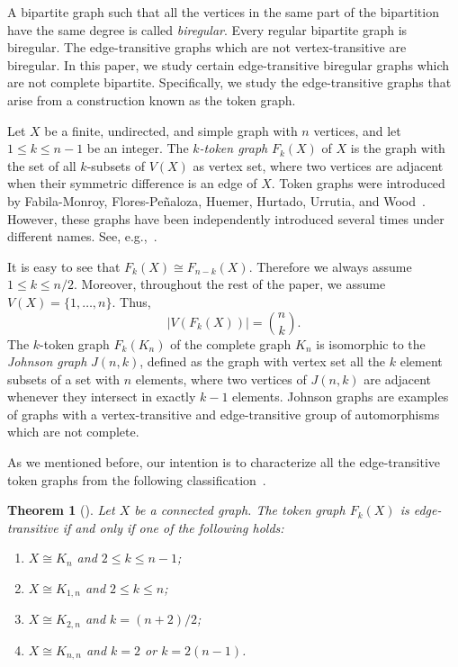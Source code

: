 \documentclass[letterpaper,10pt]{article}
\theoremstyle{plain}
\newtheorem{theorem}{Theorem}[section]
\theoremstyle{definition}
\newcommand{\G}{X}
\begin{document}
A bipartite graph such that all the vertices in the same part of the bipartition have the same degree is called \emph{biregular}. 
Every regular bipartite graph is biregular. 
The edge-transitive graphs which are not vertex-transitive are biregular. 
In this paper, we study certain edge-transitive biregular graphs which are not complete bipartite.  
Specifically,  we study the edge-transitive  graphs that arise from a construction known as the token graph. 



Let $\G$ be a finite, undirected, and simple graph with $n$ vertices, and let $1 \le k \le n-1 $ be an integer. 
The \emph{$k$-token graph} $F_k(\G)$ of $\G$ is the graph 
with the set of all $k$-subsets of $V(X)$ as vertex set, where two vertices are adjacent when their symmetric difference is an edge of $\G$. 
Token graphs were introduced by Fabila-Monroy, Flores-Peñaloza, Huemer, Hurtado, Urrutia, and Wood~\cite{FFHH}. 
However, these graphs have been independently introduced several times under different names. See, e.g.,~\cite{John,ABE,AGR}.

It is easy to see that $F_{k}(\G) \cong F_{n-k}(\G)$. 
Therefore we always assume $1 \leq k \leq n/2$. 
Moreover, throughout the rest of the paper, we assume 
$V(X)  = \{1, \dots, n\}$. 
Thus, 
\[
|V(F_{k}(\G))| =\binom{n}{k}. 
\]
The $k$-token graph $F_k(K_n)$ of the complete graph $K_n$ is isomorphic to the \emph{Johnson graph} $J(n,k)$, defined as the graph with vertex set all the $k$ element subsets of a set with $n$ elements, where two vertices of $J(n,k)$ are adjacent whenever they intersect in exactly $k-1$ elements. 
Johnson graphs are examples of graphs with  a vertex-transitive and edge-transitive group of automorphisms which are not complete.

As we mentioned before, our intention is to characterize all the edge-transitive token graphs  from the following classification~\cite[Theorem 1.2]{ZZ}. 

\begin{theorem}[\cite{ZZ}]
Let $X$ be a connected graph. 
The token graph $F_k(X)$  is edge-transitive if and only if one of the following holds:
\begin{enumerate}[(1)]
    \item $X\cong K_n$ and $2\leq k \leq n-1$;
    \item $X\cong K_{1,n}$ and $2\leq k \leq n$;
    \item $X\cong K_{2,n}$ and $k = (n+2)/2$;
    \item $X\cong K_{n,n}$ and $k = 2$ or $k=2(n-1)$.
\end{enumerate}
\end{theorem}
\end{document}
